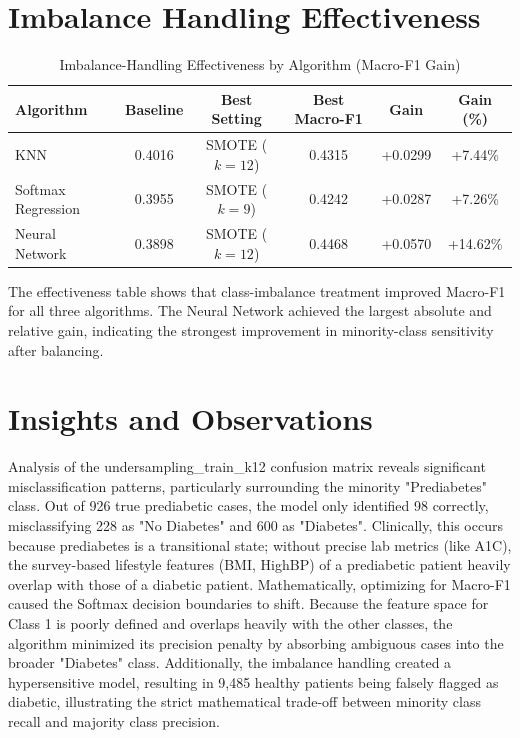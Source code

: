\documentclass[12pt,a4paper]{report}
\begin{document}
\newpage
\section{Imbalance Handling Effectiveness}
\begin{table}[H]
    \centering
    \small
    \caption{Imbalance-Handling Effectiveness by Algorithm (Macro-F1 Gain)}
    \label{tab:imbalance-effectiveness}
    \begin{tabular}{lccccc}
        \toprule
        \textbf{Algorithm} & \textbf{Baseline} & \textbf{Best Setting} & \textbf{Best Macro-F1} & \textbf{Gain} & \textbf{Gain (\%)} \\
        \midrule
        KNN & 0.4016 & SMOTE ($k=12$) & 0.4315 & +0.0299 & +7.44\% \\
        Softmax Regression & 0.3955 & SMOTE ($k=9$) & 0.4242 & +0.0287 & +7.26\% \\
        Neural Network & 0.3898 & SMOTE ($k=12$) & 0.4468 & +0.0570 & +14.62\% \\
        \bottomrule
    \end{tabular}
\end{table}

The effectiveness table shows that class-imbalance treatment improved Macro-F1 for all three algorithms. The Neural Network achieved the largest absolute and relative gain, indicating the strongest improvement in minority-class sensitivity after balancing.

\newpage
\section{Insights and Observations}
Analysis of the undersampling\_train\_k12 confusion matrix reveals significant misclassification patterns, particularly surrounding the minority "Prediabetes" class. Out of 926 true prediabetic cases, the model only identified 98 correctly, misclassifying 228 as "No Diabetes" and 600 as "Diabetes". Clinically, this occurs because prediabetes is a transitional state; without precise lab metrics (like A1C), the survey-based lifestyle features (BMI, HighBP) of a prediabetic patient heavily overlap with those of a diabetic patient. Mathematically, optimizing for Macro-F1 caused the Softmax decision boundaries to shift. Because the feature space for Class 1 is poorly defined and overlaps heavily with the other classes, the algorithm minimized its precision penalty by absorbing ambiguous cases into the broader "Diabetes" class. Additionally, the imbalance handling created a hypersensitive model, resulting in 9,485 healthy patients being falsely flagged as diabetic, illustrating the strict mathematical trade-off between minority class recall and majority class precision.
\end{document}
